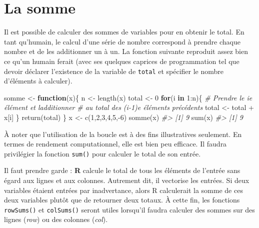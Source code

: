 \documentclass[
]{book}
\newenvironment{Shaded}{}{}
\newcommand{\CommentTok}[1]{\textit{#1}}
\newcommand{\ControlFlowTok}[1]{\textbf{#1}}
\newcommand{\DecValTok}[1]{#1}
\newcommand{\FunctionTok}[1]{#1}
\newcommand{\NormalTok}[1]{#1}
\newcommand{\OtherTok}[1]{#1}
\newcommand{\SpecialCharTok}[1]{#1}
\begin{document}
\hypertarget{la-somme}{%
\section{La somme}\label{la-somme}}

Il est possible de calculer des sommes de variables pour en obtenir le total. En tant qu'humain, le calcul d'une série de nombre correspond à prendre chaque nombre et de les additionner un à un. La fonction suivante reproduit assez bien ce qu'un humain ferait (avec ses quelques caprices de programmation tel que devoir déclarer l'existence de la variable de \texttt{total} et spécifier le nombre d'éléments à calculer).

\begin{Shaded}
\begin{Highlighting}[]
\NormalTok{somme }\OtherTok{\textless{}{-}} \ControlFlowTok{function}\NormalTok{(x)\{}
\NormalTok{  n }\OtherTok{\textless{}{-}} \FunctionTok{length}\NormalTok{(x)}
\NormalTok{  total }\OtherTok{\textless{}{-}} \DecValTok{0}
  \ControlFlowTok{for}\NormalTok{(i }\ControlFlowTok{in} \DecValTok{1}\SpecialCharTok{:}\NormalTok{n)\{}
    \CommentTok{\# Prendre le ie élément et l\textquotesingle{}additionner}
    \CommentTok{\# au total des (i{-}1)e éléments précédents}
\NormalTok{    total }\OtherTok{\textless{}{-}}\NormalTok{ total }\SpecialCharTok{+}\NormalTok{ x[i]}
\NormalTok{  \}}
  \FunctionTok{return}\NormalTok{(total)}
\NormalTok{\}}
\NormalTok{x }\OtherTok{\textless{}{-}} \FunctionTok{c}\NormalTok{(}\DecValTok{1}\NormalTok{,}\DecValTok{2}\NormalTok{,}\DecValTok{3}\NormalTok{,}\DecValTok{4}\NormalTok{,}\DecValTok{5}\NormalTok{,}\SpecialCharTok{{-}}\DecValTok{6}\NormalTok{)}
\FunctionTok{somme}\NormalTok{(x)}
\CommentTok{\#\textgreater{} [1] 9}
\FunctionTok{sum}\NormalTok{(x)}
\CommentTok{\#\textgreater{} [1] 9}
\end{Highlighting}
\end{Shaded}

À noter que l'utilisation de la boucle est à des fins illustratives seulement. En termes de rendement computationnel, elle est bien peu efficace. Il faudra privilégier la fonction \texttt{sum()} pour calculer le total de son entrée.

Il faut prendre garde : \textbf{R} calcule le total de tous les éléments de l'entrée sans égard aux lignes et aux colonnes. Autrement dit, il vectorise les entrées. Si deux variables étaient entrées par inadvertance, alors R calculerait la somme de ces deux variables plutôt que de retourner deux totaux. À cette fin, les fonctions \texttt{rowSums()} et \texttt{colSums()} seront utiles lorsqu'il faudra calculer des sommes sur des lignes (\emph{row}) ou des colonnes (\emph{col}).
\end{document}
